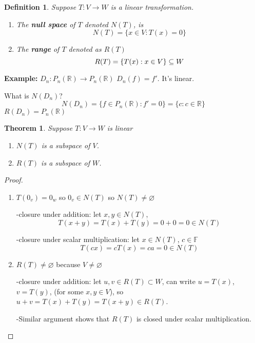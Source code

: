 \documentclass[12pt]{article}
\newtheorem{theorem}{Theorem}[subsection]
\newtheorem{definition}{Definition}[subsection]
\newcommand{\mR}{{\mathbb{R}}}
\newcommand{\mF}{{\mathbb{F}}}
\begin{document}
	\begin{definition}
		Suppose $T : V\to W$ is a linear transformation. 
		\begin{enumerate}
			\item The \textbf{null space} of $T$ denoted $N(T)$, is 
			\[
				N(T) = \{x \in V :T(x) = 0\}
			\]
			\item The \textbf{range} of $T$ denoted as $R(T)$
			\[
				R(T) = \{T(x) : x \in V\} \subseteq W\\
			\]
		\end{enumerate}
	\end{definition}

	{\color{Brown}
		\textbf{Example:} 
		$D_n : P_n(\mR) \to P_n (\mR)$ $D_n(f) = f'$. It's linear. 

		What is $N(D_n)$? 
		\[
			N(D_n) = \{f\in P_n(\mR):f'=0\} = \{c : c\in \mR\}
		\]
		$R(D_n) = P_n(\mR)$ \\
	}

	\begin{theorem}
		Suppose $T : V \to W$ is linear 
		\begin{enumerate}
			\item $N(T)$ is a subspace of $V$. 

			\item $R(T)$ is a subspace of $W$. 
		\end{enumerate}
	\end{theorem}
	\begin{proof}
		$ $
		\begin{enumerate}
			\item $T(0_v) = 0_w$ so $0_v \in N(T)$ so $N(T) \neq \varnothing$

			-closure under addition: let $x, y \in N(T)$, 
			\[
				T(x+y) = T(x) + T(y) = 0+0=0 \in N(T)
			\]

			-closure under scalar multiplication: let $x \in N(T)$, $c\in \mF$
			\[
				T(cx) = c T(x) = ca =0 \in N(T)
			\]
		\item $R(T) \neq \varnothing$ because $V\neq \varnothing$ 
			
			-closure under addition: let $u, v \in R(T) \subset W$,
			can write $u = T(x)$, $v = T(y)$, (for some $x,y \in V$), 
			so $u+v = T(x) + T(y) = T(x+y) \in R(T)$. 

			-Similar argument shows 
			that $R(T)$ is closed under scalar multiplication. 
		\end{enumerate}
	\end{proof}
\end{document}
